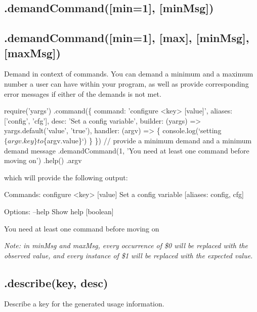 \subsection*{\label{_demandCommand}%
.demand\+Command(\mbox{[}min=1\mbox{]}, \mbox{[}min\+Msg\mbox{]}) }

\subsection*{.demand\+Command(\mbox{[}min=1\mbox{]}, \mbox{[}max\mbox{]}, \mbox{[}min\+Msg\mbox{]}, \mbox{[}max\+Msg\mbox{]}) }

Demand in context of commands. You can demand a minimum and a maximum number a user can have within your program, as well as provide corresponding error messages if either of the demands is not met. 
\begin{DoxyCode}
require('yargs')
  .command(\{
    command: 'configure <key> [value]',
    aliases: ['config', 'cfg'],
    desc: 'Set a config variable',
    builder: (yargs) => yargs.default('value', 'true'),
    handler: (argv) => \{
      console.log(`setting $\{argv.key\} to $\{argv.value\}`)
    \}
  \})
  // provide a minimum demand and a minimum demand message
  .demandCommand(1, 'You need at least one command before moving on')
  .help()
  .argv
\end{DoxyCode}


which will provide the following output\+:


\begin{DoxyCode}
Commands:
  configure <key> [value]  Set a config variable         [aliases: config, cfg]

Options:
  --help  Show help                                                   [boolean]

You need at least one command before moving on
\end{DoxyCode}


{\itshape Note\+: in {\ttfamily min\+Msg} and {\ttfamily max\+Msg}, every occurrence of {\ttfamily \$0} will be replaced with the observed value, and every instance of {\ttfamily \$1} will be replaced with the expected value.}

\subsection*{\label{_describe}%
.describe(key, desc) }

Describe a {\ttfamily key} for the generated usage information.

